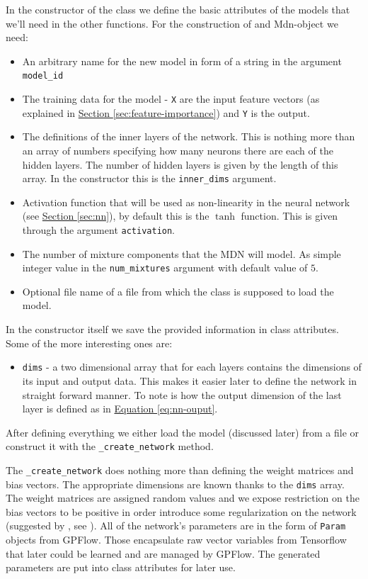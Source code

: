 \documentclass[12pt,a4paper,twoside]{scrartcl}
\numberwithin{equation}{section}
\newcommand{\refsec}[1]{\hyperref[#1]{Section \ref*{#1}}}
\renewcommand*{\refeq}[1]{\hyperref[#1]{Equation \ref*{#1}}}
\begin{document}
In the constructor of the class we define the basic attributes of the models that we'll need in the other functions. For the construction of and Mdn-object we need:
\begin{itemize}
\item An arbitrary name for the new model in form of a string in the argument \texttt{model\_id}
\item The training data for the model - \texttt{X} are the input feature vectors (as explained in \refsec{sec:feature-importance})  and \texttt{Y} is the output.
\item The definitions of the inner layers of the network. This is nothing more than an array of numbers specifying how many neurons there are each of the hidden layers. The number of hidden layers is given by the length of this array. In the constructor this is the \texttt{inner\_dims} argument.
\item Activation function that will be used as non-linearity in the neural network (see \refsec{sec:nn}), by default this is the \(\tanh\) function. This is given through the argument \texttt{activation}.
\item The number of mixture components that the MDN will model. As simple integer value in the \texttt{num\_mixtures} argument with default value of \(5\).
\item Optional file name of a file from which the class is supposed to load the model.
\end{itemize}
In the constructor itself we save the provided information in class attributes. Some of the more interesting ones are:
\begin{itemize}
\item \texttt{dims} - a two dimensional array that for each layers contains the dimensions of its input and output data. This makes it easier later to define the network in straight forward manner. To note is how the output dimension of the last layer is defined as in \refeq{eq:nn-ouput}.
\end{itemize}
After defining everything we either load the model (discussed later) from a file or construct it with the \texttt{\_create\_network} method.

The \texttt{\_create\_network} does nothing more than defining the weight matrices and bias vectors. The appropriate dimensions are known thanks to the \texttt{dims} array. The weight matrices are assigned random values and we expose restriction on the bias vectors to be positive in order introduce some regularization on the network (suggested by \cite{mdntut}, see \cite{hinz18}). All of the network's parameters are in the form of \texttt{Param} objects from GPFlow. Those encapsulate raw vector variables from Tensorflow that later could be learned and are managed by GPFlow. The generated parameters are put into class attributes for later use.
\end{document}
